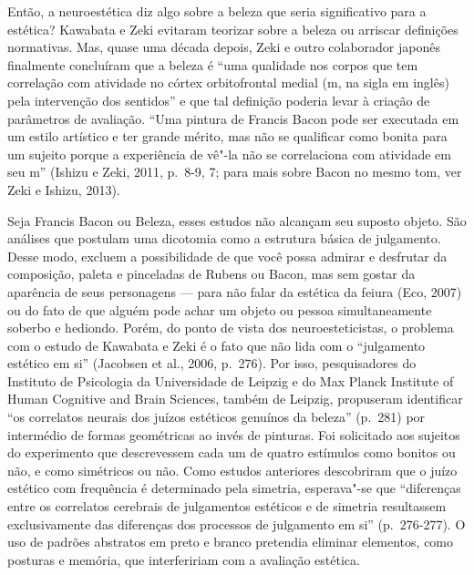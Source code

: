 Então, a neuroestética diz algo sobre a beleza que seria significativo
para a estética? Kawabata e Zeki evitaram teorizar sobre a beleza ou
arriscar definições normativas. Mas, quase uma década depois, Zeki e
outro colaborador japonês finalmente concluíram que a beleza é ``uma
qualidade nos corpos que tem correlação com atividade no córtex
orbitofrontal medial (m, na sigla em inglês) pela intervenção dos
sentidos'' e que tal definição poderia levar à criação de parâmetros de
avaliação. ``Uma pintura de Francis Bacon pode ser executada em um
estilo artístico e ter grande mérito, mas não se qualificar como bonita
para um sujeito porque a experiência de vê"-la não se correlaciona com
atividade em seu m'' (Ishizu e Zeki, 2011, p.~8-9, 7; para mais sobre
Bacon no mesmo tom, ver Zeki e Ishizu, 2013).

Seja Francis Bacon ou Beleza, esses estudos não alcançam seu suposto
objeto. São análises que postulam uma dicotomia como a estrutura básica
de julgamento. Desse modo, excluem a possibilidade de que você possa
admirar e desfrutar da composição, paleta e pinceladas de Rubens ou
Bacon, mas sem gostar da aparência de seus personagens --- para não
falar da estética da feiura (Eco, 2007) ou do fato de que alguém pode
achar um objeto ou pessoa simultaneamente soberbo e hediondo. Porém, do
ponto de vista dos neuroesteticistas, o problema com o estudo de
Kawabata e Zeki é o fato que não lida com o ``julgamento estético em
si'' (Jacobsen et al., 2006, p.~276). Por isso, pesquisadores do
Instituto de Psicologia da Universidade de Leipzig e do Max Planck
Institute of Human Cognitive and Brain Sciences, também de Leipzig,
propuseram identificar ``os correlatos neurais dos juízos estéticos
genuínos da beleza'' (p.~281) por intermédio de formas geométricas ao
invés de pinturas. Foi solicitado aos sujeitos do experimento que
descrevessem cada um de quatro estímulos como bonitos ou não, e como
simétricos ou não. Como estudos anteriores descobriram que o juízo
estético com frequência é determinado pela simetria, esperava"-se que
``diferenças entre os correlatos cerebrais de julgamentos estéticos e de
simetria resultassem exclusivamente das diferenças dos processos de
julgamento em si'' (p.~276-277). O uso de padrões abstratos em preto e
branco pretendia eliminar elementos, como posturas e memória, que
interfeririam com a avaliação estética.

